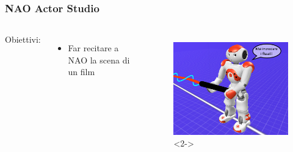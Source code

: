 \documentclass[aspectratio=169]{beamer}
\begin{document}
\begin{frame}
\frametitle{NAO Actor Studio}
\begin{columns}
		Obiettivi:
		\begin{itemize}
			\item<2-> Far recitare a NAO la scena di un film
		\end{itemize}
		\begin{figure}[ht]
		\begin{center}
		\includegraphics[width=.9\textwidth]{flussi}<2->
		\end{center}
		\end{figure}
\end{columns}
\end{frame}
\end{document}
